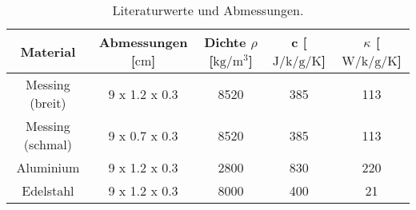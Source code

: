 \begin{table}
    \centering
    \caption{Literaturwerte und Abmessungen. \cite{skript} \cite{lit}}
    \label{tab:einfach}
    \begin{tabular}{c |c |c |c | c}
        \toprule
        Material   & Abmessungen [$\si{\centi\meter}$] &  Dichte $\rho$ [$\si{\kilo\gram\per\meter\tothe{3}}$]  & c [$\si{\joule\per\kilo\per\gram\per\kelvin}$] & $\kappa$ [$\si{\watt\per\kilo\per\gram\per\kelvin}$] \\
        \midrule
        Messing (breit)     &   9 x 1.2 x 0.3   & 8520& 385 & 113\\
        Messing (schmal)     &   9 x 0.7 x 0.3   & 8520& 385 & 113\\
        Aluminium&      9 x 1.2 x 0.3& 2800& 830& 220 \\
        Edelstahl&      9 x 1.2 x 0.3& 8000& 400& 21 \\
        \bottomrule
    \end{tabular}
\end{table}
